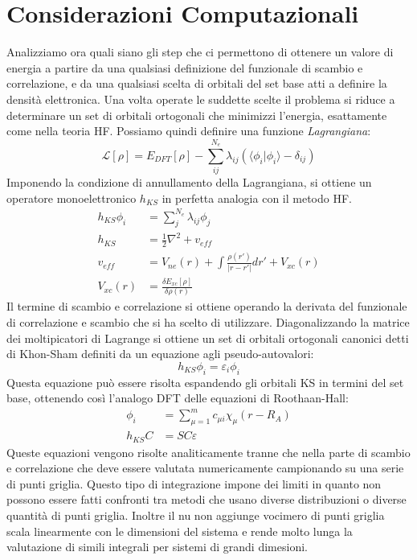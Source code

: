 \documentclass[oneside]{amsbook}
\numberwithin{section}{chapter}
\numberwithin{equation}{section}
\numberwithin{figure}{section}
\begin{document}
\section{Considerazioni Computazionali}
Analizziamo ora quali siano gli step che ci permettono di ottenere un valore di energia a partire da una qualsiasi definizione del funzionale di scambio e correlazione, e da una qualsiasi scelta di orbitali del set base atti a definire la densità elettronica. 
Una volta operate le suddette scelte il problema si riduce a determinare un set di orbitali ortogonali che minimizzi l'energia, esattamente come nella teoria HF. Possiamo quindi definire una funzione \emph{Lagrangiana}:
\begin{equation}
\mathcal{L}[\rho]= E_{DFT}[\rho]-\sum \limits _{ij} ^{N_e} \lambda_{ij}(\langle\phi_i\vert\phi_i\rangle-\delta_{ij})
\end{equation}
Imponendo la condizione di annullamento della Lagrangiana, si ottiene un operatore monoelettronico $h_{KS}$ in perfetta analogia con il metodo HF.
\begin{equation}
\begin{aligned}
h_{KS} \phi_i &= \sum \limits _{j} ^{N_e} \lambda_{ij} \phi_j \\
h_{KS} &= \frac{1}{2} \nabla^2 +v_{eff} \\
v_{eff}&= V_{ne}(r)+\int \frac{\rho (r')}{\vert r-r' \vert} dr' +V_{xc}(r)\\
V_{xc}(r)&= \frac{\delta E_{xc}[\rho]}{\delta \rho(r)}
\end{aligned}
\end{equation}
Il termine di scambio e correlazione si ottiene operando la derivata del funzionale di correlazione e scambio che si ha scelto di utilizzare.
Diagonalizzando la matrice dei moltipicatori di Lagrange si ottiene un set di orbitali ortogonali canonici detti di Khon-Sham definiti da un equazione agli pseudo-autovalori:
\begin{equation}
h_{KS}\phi_i=\varepsilon_i\phi_i
\end{equation}
Questa equazione può essere risolta espandendo gli orbitali KS in termini del set base, ottenendo così l'analogo DFT delle equazioni di Roothaan-Hall:
\begin{equation}
\begin{aligned}
\phi_i &= \sum \limits_{\mu = 1}^m c_{\mu i }\chi_{\mu} (r-R_A)\\
h_{KS}C &= SC\varepsilon
\end{aligned}
\end{equation}
Queste equazioni vengono risolte analiticamente tranne che nella parte di scambio e correlazione che deve essere valutata numericamente campionando su una serie di punti griglia. Questo tipo di integrazione impone dei limiti in quanto non possono essere fatti confronti tra metodi che usano diverse distribuzioni o diverse quantità di punti griglia. Inoltre il nu non aggiunge vocimero di punti griglia scala linearmente con le dimensioni del sistema e rende molto lunga la valutazione di simili integrali per sistemi di grandi dimesioni.
\end{document}
